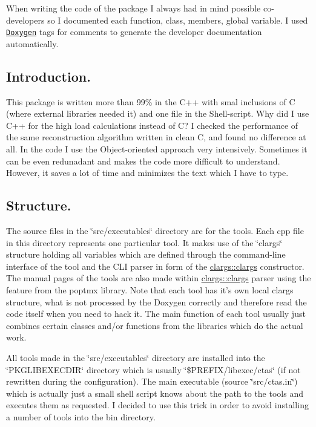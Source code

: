 When writing the code of the package I always had in mind possible co-\/developers so I documented each function, class, members, global variable. I used \href{http://www.doxygen.org}{\tt Doxygen} tags for comments to generate the developer documentation automatically.\hypertarget{index_intro}{}\subsection{Introduction.}\label{index_intro}
This package is written more than 99\% in the C++ with smal inclusions of C (where external libraries needed it) and one file in the Shell-\/script. Why did I use C++ for the high load calculations instead of C? I checked the performance of the same reconstruction algorithm written in clean C, and found no difference at all. In the code I use the Object-\/oriented approach very intensively. Sometimes it can be even redunadant and makes the code more difficult to understand. However, it saves a lot of time and minimizes the text which I have to type.\hypertarget{index_struct}{}\subsection{Structure.}\label{index_struct}
The source files in the \char`\"{}src/executables\char`\"{} directory are for the tools. Each cpp file in this directory represents one particular tool. It makes use of the \char`\"{}clargs\char`\"{} structure holding all variables which are defined through the command-\/line interface of the tool and the CLI parser in form of the \hyperlink{structclargs_ac5a54b5b965289a3ad0766317ae630dd}{clargs::clargs} constructor. The manual pages of the tools are also made within \hyperlink{structclargs_ac5a54b5b965289a3ad0766317ae630dd}{clargs::clargs} parser using the feature from the poptmx library. Note that each tool has it's own local clargs structure, what is not processed by the Doxygen correctly and therefore read the code itself when you need to hack it. The main function of each tool usually just combines certain classes and/or functions from the libraries which do the actual work.

All tools made in the \char`\"{}src/executables\char`\"{} directory are installed into the \char`\"{}PKGLIBEXECDIR\char`\"{} directory which is usually \char`\"{}\$PREFIX/libexec/ctas\char`\"{} (if not rewritten during the configuration). The main executable (source \char`\"{}src/ctas.in\char`\"{}) which is actually just a small shell script knows about the path to the tools and executes them as requested. I decided to use this trick in order to avoid installing a number of tools into the bin directory.

